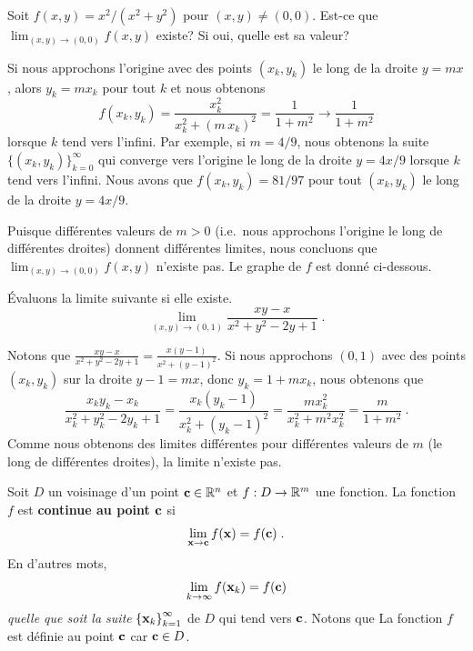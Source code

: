 {\begin{egg}
Soit $f(x,y) = x^2 / (x^2 + y^2)$ pour $(x,y) \neq (0,0)$.
Est-ce que $\displaystyle \lim_{(x,y)\rightarrow (0,0)} f(x,y)$
existe?  Si oui, quelle est sa valeur?

Si nous approchons l'origine avec des points $(x_k,y_k)$ le long de la
droite $y=mx$, alors $y_k = m x_k$ pour tout $k$ et nous obtenons
\[
f(x_k,y_k) = \frac{x_k^2}{x_k^2 + (m\,x_k)^2} = \frac{1}{1+m^2}
\rightarrow \frac{1}{1+m^2}
\]
lorsque $k$ tend vers l'infini.  Par exemple, si $m=4/9$, nous
obtenons la suite $\displaystyle \{(x_k,y_k)\}_{k=0}^\infty$ qui converge
vers l'origine le long de la droite $y=4x/9$ lorsque $k$ tend vers
l'infini.
Nous avons que $f(x_k,y_k) = 81/97$ pour tout $(x_k,y_k)$ le long de la
droite $y=4x/9$.

Puisque différentes valeurs de $m>0$ (i.e.\ nous approchons l'origine
le long de différentes droites) donnent différentes limites,
nous concluons que $\displaystyle \lim_{(x,y)\rightarrow (0,0)} f(x,y)$
n'existe pas.  Le graphe de $f$ est donné ci-dessous.
\end{egg}

\begin{egg}
Évaluons la limite suivante si elle existe.
\[
\lim_{(x,y)\rightarrow (0,1)} \frac{xy-x}{x^2+y^2-2y+1} \; .
\]

Notons que
$\displaystyle \frac{xy-x}{x^2+y^2-2y+1} = \frac{x(y-1)}{x^2+(y-1)^2}$.
Si nous approchons $(0,1)$ avec des points $(x_k,y_k)$ sur la droite
$y-1=mx$, donc $y_k = 1 + m x_k$, nous obtenons que
\[
\frac{x_k y_k-x_k}{x_k^2+y_k^2-2y_k+1} 
= \frac{x_k(y_k-1)}{x_k^2+(y_k-1)^2}
= \frac{m x_k^2}{x_k^2+m^2 x_k^2}
= \frac{m}{1+m^2} \ .
\]
Comme nous obtenons des limites différentes pour différentes valeurs de
$m$ (le long de différentes droites), la limite n'existe pas.
\end{egg}

\begin{defn} 
Soit $D$ un voisinage d'un point $\mathbf{c} \in \mathbb{R}^n$ et
$f:D\rightarrow \mathbb{R}^m$ une fonction.  La fonction $f$ est
{\bfseries continue au point $\mathbf{c}$} si
\[
\lim_{\mathbf{x}\rightarrow \mathbf{c}} f(\mathbf{x}) = f(\mathbf{c}) \; .
\]
En d'autres mots,
\[
\lim_{k\rightarrow \infty} f(\mathbf{x}_k) = f(\mathbf{c})
\]
{\em quelle que soit la suite} 
$\displaystyle \left\{\mathbf{x}_k\right\}_{k=1}^\infty$ de $D$ qui tend
vers $\mathbf{c}$.
Notons que La fonction $f$ est définie au point $\mathbf{c}$ car $\mathbf{c}
\in D$.   


\end{defn}}
